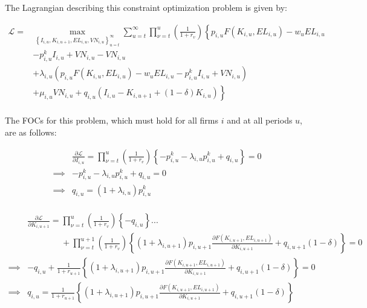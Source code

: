 \documentclass[letterpaper,12pt]{article}
\theoremstyle{definition}
\begin{document}
\begin{spacing}{1.5}
The Lagrangian describing this constraint optimization problem is given by:

\begin{equation}
\label{eqn:firm_lagrange}
\begin{split}
\mathcal{L} = &  \max_{\left\{I_{i,u},K_{i,u+1},EL_{i,u},VN_{i,u}\right\}_{u=t}^{\infty}} \sum_{u=t}^{\infty} \prod_{\nu=t}^{u} \left(\frac{1}{1+r_{v}}\right) \left\{ p_{i,u}F(K_{i,u},EL_{i,u}) - w_{u}EL_{i,u} \right.\\
       & \left. -p^{k}_{i,u}I_{i,u} +VN_{i,u} - VN_{i,u} \right. \\
       &+\left. \lambda_{i,u}(p_{i,u}F(K_{i,u},EL_{i,u}) - w_{u}EL_{i,u} -p^{k}_{i,u}I_{i,u} +VN_{i,u}) \right. \\
       &+ \left. \mu_{i,u}VN_{i,u} + q_{i,u}(I_{i,u} - K_{i,u+1} + (1-\delta)K_{i,u})\right\} \\
\end{split}
\end{equation}

The FOCs for this problem, which must hold for all firms $i$ and at all periods $u$, are as follows:

\begin{equation}
\label{eqn:lagrange_foc_i}
\begin{split}
& \frac{\partial \mathcal{L}}{\partial I_{i,u}} = \prod_{\nu=t}^{u} \left(\frac{1}{1+r_{v}}\right) \left\{ -p^{k}_{i,u} - \lambda_{i,u}p^{k}_{i,u} + q_{i,u} \right\} = 0 \\
\implies &   -p^{k}_{i,u} - \lambda_{i,u}p^{k}_{i,u} + q_{i,u} = 0 \\
\implies & q_{i,u} = (1+\lambda_{i,u})p^{k}_{i,u} \\
\end{split}
\end{equation}


\begin{equation}
\label{eqn:lagrange_foc_k}
\begin{split}
& \frac{\partial \mathcal{L}}{\partial K_{i,u+1}} =   \prod_{\nu=t}^{u} \left(\frac{1}{1+r_{v}}\right) \left\{- q_{i,u} \right\} ... \\
& \quad\quad\quad\quad + \prod_{\nu=t}^{u+1} \left(\frac{1}{1+r_{v}}\right) \left\{(1+\lambda_{i,u+1})p_{i,u+1}\frac{\partial F(K_{i,u+1},EL_{i,u+1})}{\partial K_{i,u+1}} + q_{i,u+1}(1-\delta) \right\} = 0 \\
\implies &  - q_{i,u} + \frac{1}{1+r_{u+1}} \left\{(1+\lambda_{i,u+1})p_{i,u+1}\frac{\partial F(K_{i,u+1},EL_{i,u+1})}{\partial K_{i,u+1}}+ q_{i,u+1}(1-\delta)  \right\} = 0 \\
\implies & q_{i,u} =  \frac{1}{1+r_{u+1}} \left\{(1+\lambda_{i,u+1})p_{i,u+1}\frac{\partial F(K_{i,u+1},EL_{i,u+1})}{\partial K_{i,u+1}}+ q_{i,u+1}(1-\delta)  \right\}  \\
\end{split}
\end{equation}


\end{spacing}
\end{document}
